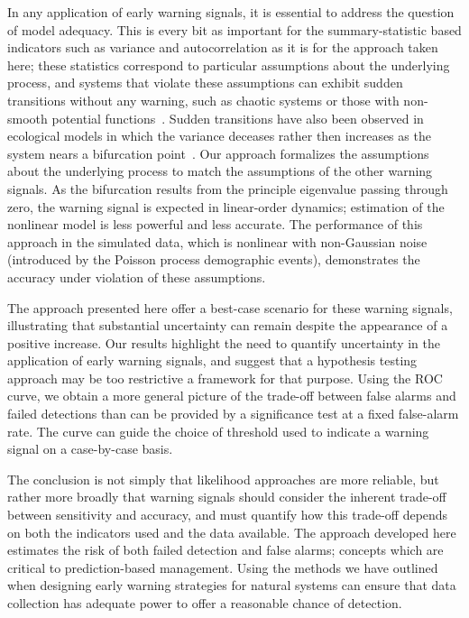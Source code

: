 \documentclass[authoryear,preprint,11pt]{elsarticle}
\begin{document}
In any application of early warning signals, it is essential to address the question of model adequacy.  
This is every bit as important for the summary-statistic based indicators such as variance and autocorrelation
as it is for the approach taken here; these statistics correspond to particular assumptions about the underlying process,
and systems that violate these assumptions can exhibit sudden transitions without any warning,
such as chaotic systems or those with non-smooth potential functions~\citep{Hastings2010}.
Sudden transitions have also been observed in ecological models in which 
the variance deceases rather then increases as the system nears a bifurcation point~\citep{Schreiber2003, Schreiber2008, Dakos2011a}.  
Our approach formalizes the assumptions about the underlying process to match the assumptions of the other warning signals.  
As the bifurcation results from the principle eigenvalue passing through zero, 
the warning signal is expected in linear-order dynamics;
estimation of the nonlinear model is less powerful and less accurate.  
The performance of this approach in the simulated data, which is nonlinear with non-Gaussian noise 
(introduced by the Poisson process demographic events), 
demonstrates the accuracy under violation of these assumptions.  


The approach presented here offer a best-case scenario for these warning signals,
illustrating that substantial uncertainty can remain despite the appearance of a positive increase.
Our results highlight the need to quantify uncertainty in the application of early warning signals,
and suggest that a hypothesis testing approach may be too restrictive a framework for that purpose.
Using the ROC curve, we obtain a more general picture of the trade-off between false alarms and failed detections
than can be provided by a significance test at a fixed false-alarm rate.  
The curve can guide the choice of threshold used to indicate a warning signal on a case-by-case basis.  


The conclusion is not simply that likelihood approaches are more reliable, 
but rather more broadly that warning signals should consider
the inherent trade-off between sensitivity and accuracy,
and must quantify how this trade-off depends on both the indicators used and the data available.  
The approach developed here estimates the risk of both failed detection and false alarms;
concepts which are critical to prediction-based management.  
Using the methods we have outlined when designing early warning strategies for natural systems
can ensure that data collection has adequate power to offer a reasonable chance of detection. 
\end{document}

